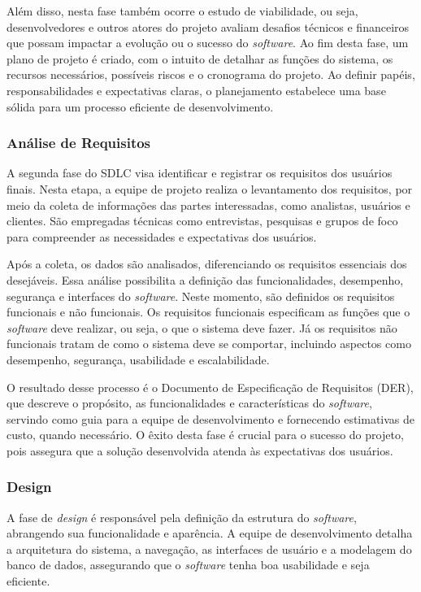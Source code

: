Além disso, nesta fase também ocorre o estudo de viabilidade, ou seja, desenvolvedores e outros atores do projeto avaliam desafios técnicos e financeiros que possam impactar a evolução ou o sucesso do \emph{software}. Ao fim desta fase, um plano de projeto é criado, com o intuito de detalhar as funções do sistema, os recursos necessários, possíveis riscos e o cronograma do projeto. Ao definir papéis, responsabilidades e expectativas claras, o planejamento estabelece uma base sólida para um processo eficiente de desenvolvimento.

\subsubsection{Análise de Requisitos}

A segunda fase do SDLC visa identificar e registrar os requisitos dos usuários finais. Nesta etapa, a equipe de projeto realiza o levantamento dos requisitos, por meio da coleta de informações das partes interessadas, como analistas, usuários e clientes. São empregadas técnicas como entrevistas, pesquisas e grupos de foco para compreender as necessidades e expectativas dos usuários.

Após a coleta, os dados são analisados, diferenciando os requisitos essenciais dos desejáveis. Essa análise possibilita a definição das funcionalidades, desempenho, segurança e interfaces do \emph{software}. Neste momento, são definidos os requisitos funcionais e não funcionais. Os requisitos funcionais especificam as funções que o \emph{software} deve realizar, ou seja, o que o sistema deve fazer. Já os requisitos não funcionais tratam de como o sistema deve se comportar, incluindo aspectos como desempenho, segurança, usabilidade e escalabilidade.

O resultado desse processo é o Documento de Especificação de Requisitos (DER), que descreve o propósito, as funcionalidades e características do \emph{software}, servindo como guia para a equipe de desenvolvimento e fornecendo estimativas de custo, quando necessário. O êxito desta fase é crucial para o sucesso do projeto, pois assegura que a solução desenvolvida atenda às expectativas dos usuários.

\subsubsection{Design}

A fase de \emph{design} é responsável pela definição da estrutura do \emph{software}, abrangendo sua funcionalidade e aparência. A equipe de desenvolvimento detalha a arquitetura do sistema, a navegação, as interfaces de usuário e a modelagem do banco de dados, assegurando que o \emph{software} tenha boa usabilidade e seja eficiente.

